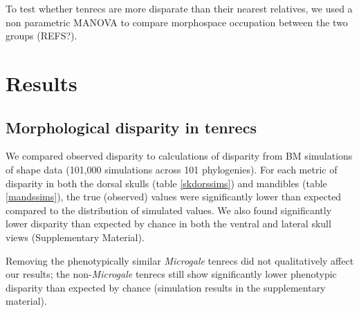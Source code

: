 \documentclass[12pt,a4paper]{article}
\begin{document}
To test whether tenrecs are more disparate than their nearest relatives, we used a non parametric MANOVA \citep{Anderson2001} to compare morphospace occupation between the two groups (REFS?). 



\section{Results}

\subsection{Morphological disparity in tenrecs} 
	

We compared observed disparity to calculations of disparity from BM simulations of shape data (101,000 simulations across 101 phylogenies). For each metric of disparity in both the dorsal skulls (table \ref{skdorssims}) and mandibles (table \ref{mandssims}), the true (observed) values were significantly lower than expected compared to the distribution of simulated values. We also found significantly lower disparity than expected by chance in both the ventral and lateral skull views (Supplementary Material).


Removing the phenotypically similar \textit{Microgale} tenrecs did not qualitatively affect our results; the non-\textit{Microgale} tenrecs still show significantly lower phenotypic disparity than expected by chance (simulation results in the supplementary material). 


\end{document}
